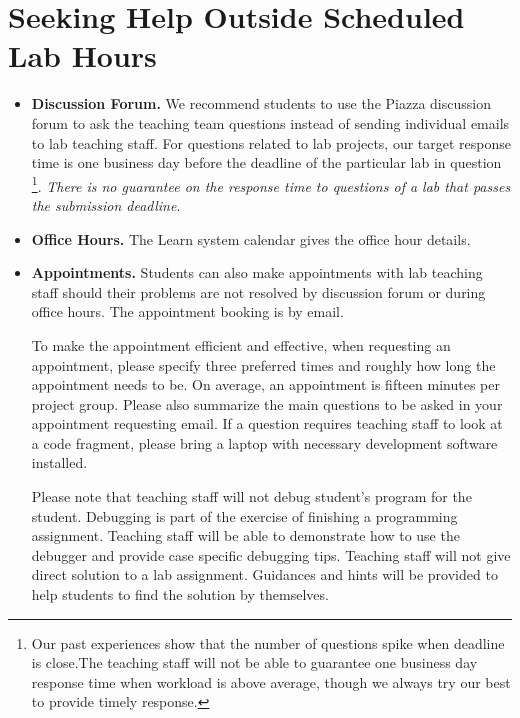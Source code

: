 \section*{Seeking Help Outside Scheduled Lab Hours}
\begin{itemize}
    \item{\bf Discussion Forum.}
      We recommend students to use the Piazza discussion forum to ask the teaching team questions instead of sending individual emails to lab teaching staff. For questions related to lab projects, our target response time is one business day before the deadline of the particular lab in question
      \footnote{Our past experiences show that the number of questions spike when deadline is close.The teaching staff will not be able to guarantee one business day response time when workload is above average, though we always try our best to provide timely response.}. 
    {\em There is no guarantee on the response time to questions of a lab that passes the submission deadline}.
    \item{\bf Office Hours.} 
    The Learn system calendar gives the office hour details.
    \item{\bf Appointments.}
    Students can also make appointments with lab teaching staff should their problems are not resolved by discussion forum or during office hours. The appointment booking is by email.
    
    To make the appointment efficient and effective, when requesting an appointment, 
    please specify three preferred times and roughly how long 
    the appointment needs to be. On average, an appointment is fifteen minutes per project group. 
    Please also summarize the main questions to be asked in your appointment requesting email.
    If a question requires teaching staff to look at a code fragment, please bring a laptop with necessary development software installed. 
    
    Please note that teaching staff will not debug student's program for the student. Debugging is part of the exercise of finishing a programming assignment. Teaching staff will be able to demonstrate how to use the debugger and provide case specific debugging tips. Teaching staff will not give direct solution to a lab assignment. Guidances and hints will be provided to help students to find the solution by themselves.
    
\end{itemize}
